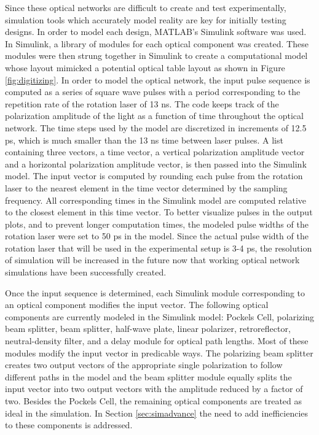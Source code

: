 \documentclass[pdftex,12pt,a4paper]{article}
\begin{document}
Since these optical networks are difficult to create and test experimentally, simulation tools which accurately model reality are key for initially testing designs. In order to model each design, MATLAB's Simulink software was used. In Simulink, a library of modules for each optical component was created. These modules were then strung together in Simulink to create a computational model whose layout mimicked a potential optical table layout as shown in Figure \ref{fig:digitizing}. In order to model the optical network, the input pulse sequence is computed as a series of square wave pulses with a period corresponding to the repetition rate of the rotation laser of 13 ns. The code keeps track of the polarization amplitude of the light as a function of time throughout the optical network. The time steps used by the model are discretized in increments of 12.5 ps, which is much smaller than the 13 ns time between laser pulses. A list containing three vectors, a time vector, a vertical polarization amplitude vector and a horizontal polarization amplitude vector, is then passed into the Simulink model. The input vector is computed by rounding each pulse from the rotation laser to the nearest element in the time vector determined by the sampling frequency. All corresponding times in the Simulink model are computed relative to the closest element in this time vector. To better visualize pulses in the output plots, and to prevent longer computation times, the modeled pulse widths of the rotation laser were set to 50 ps in the model. Since the actual pulse width of the rotation laser that will be used in the experimental setup is 3-4 ps, the resolution of simulation will be increased in the future now that working optical network simulations have been successfully created.

Once the input sequence is determined, each Simulink module corresponding to an optical component modifies the input vector. The following optical components are currently modeled in the Simulink model: Pockels Cell, polarizing beam splitter, beam splitter, half-wave plate, linear polarizer, retroreflector, neutral-density filter, and a delay module for optical path lengths. Most of these modules modify the input vector in predicable ways. The polarizing beam splitter creates two output vectors of the appropriate single polarization to follow different paths in the model and the beam splitter module equally splits the input vector into two output vectors with the amplitude reduced by a factor of two. Besides the Pockels Cell, the remaining optical components are treated as ideal in the simulation. In Section \ref{sec:simadvance} the need to add inefficiencies to these components is addressed.
\end{document}
